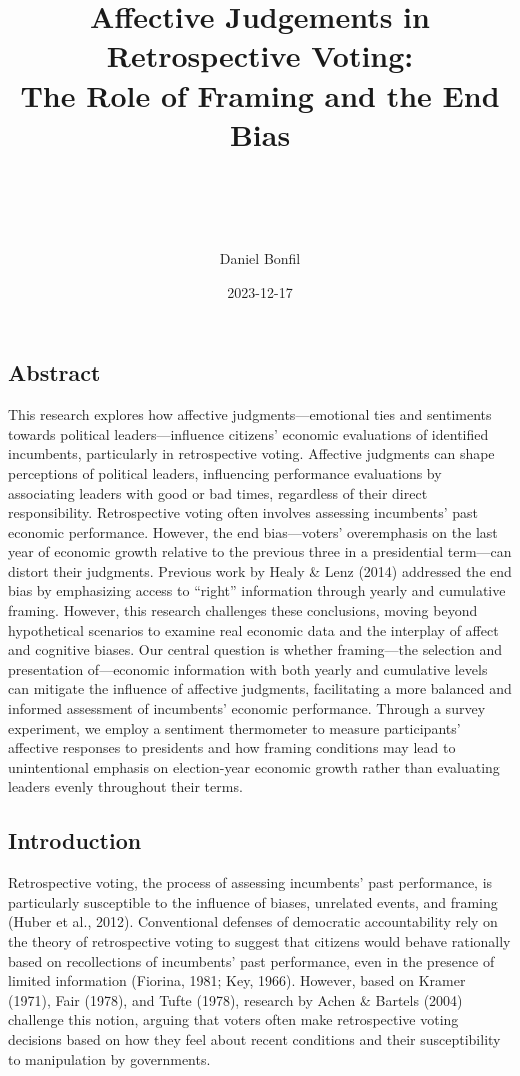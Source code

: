 \documentclass[
]{article}
\title{\hfill\break
\hfill\break
Affective Judgements in Retrospective Voting:\\
The Role of Framing and the End Bias\\
\strut \\}
\subtitle{\hfill\break
\hfill\break
FGV EBAPE\\
\strut \\
\strut \\
First Qualifying Examination\\
(Conceptual Paper)\\
\strut \\}
\author{Daniel Bonfil}
\date{2023-12-17}
\begin{document}
\maketitle

{
\setcounter{tocdepth}{2}
\tableofcontents
}
\newpage
\doublespacing

\hypertarget{abstract}{%
\subsection{Abstract}\label{abstract}}

This research explores how affective judgments---emotional ties and
sentiments towards political leaders---influence citizens' economic
evaluations of identified incumbents, particularly in retrospective
voting. Affective judgments can shape perceptions of political leaders,
influencing performance evaluations by associating leaders with good or
bad times, regardless of their direct responsibility. Retrospective
voting often involves assessing incumbents' past economic performance.
However, the end bias---voters' overemphasis on the last year of
economic growth relative to the previous three in a presidential
term---can distort their judgments. Previous work by Healy \& Lenz
(2014) addressed the end bias by emphasizing access to ``right''
information through yearly and cumulative framing. However, this
research challenges these conclusions, moving beyond hypothetical
scenarios to examine real economic data and the interplay of affect and
cognitive biases. Our central question is whether framing---the
selection and presentation of---economic information with both yearly
and cumulative levels can mitigate the influence of affective judgments,
facilitating a more balanced and informed assessment of incumbents'
economic performance. Through a survey experiment, we employ a sentiment
thermometer to measure participants' affective responses to presidents
and how framing conditions may lead to unintentional emphasis on
election-year economic growth rather than evaluating leaders evenly
throughout their terms.

\hypertarget{introduction}{%
\subsection{Introduction}\label{introduction}}

Retrospective voting, the process of assessing incumbents' past
performance, is particularly susceptible to the influence of biases,
unrelated events, and framing (Huber et al., 2012). Conventional
defenses of democratic accountability rely on the theory of
retrospective voting to suggest that citizens would behave rationally
based on recollections of incumbents' past performance, even in the
presence of limited information (Fiorina, 1981; Key, 1966). However,
based on Kramer (1971), Fair (1978), and Tufte (1978), research by Achen
\& Bartels (2004) challenge this notion, arguing that voters often make
retrospective voting decisions based on how they feel about recent
conditions and their susceptibility to manipulation by governments.
\end{document}

